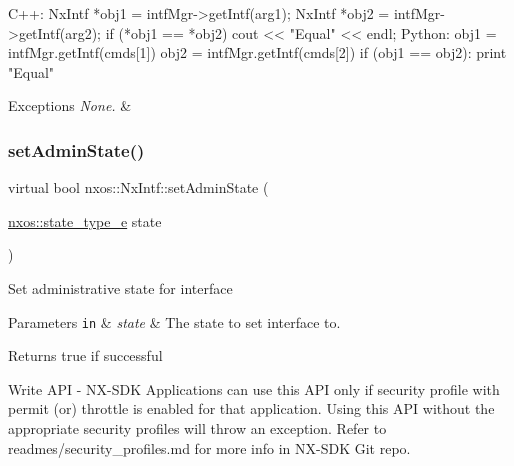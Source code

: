 \begin{DoxyCode}
C++:
     NxIntf *obj1 = intfMgr->getIntf(arg1);
     NxIntf *obj2 = intfMgr->getIntf(arg2);
     \textcolor{keywordflow}{if} (*obj1 == *obj2)
         cout << \textcolor{stringliteral}{"Equal"} << endl;
Python:
     obj1 = intfMgr.getIntf(cmds[1])
     obj2 = intfMgr.getIntf(cmds[2])
     \textcolor{keywordflow}{if} (obj1 == obj2):
         print \textcolor{stringliteral}{"Equal"}
\end{DoxyCode}



\begin{DoxyExceptions}{Exceptions}
{\em None.} & \\
\hline
\end{DoxyExceptions}
\mbox{\label{classnxos_1_1_nx_intf_a2244d9def0a3538d1f66f8816ad8b545}} 
\subsubsection{\texorpdfstring{set\+Admin\+State()}{setAdminState()}}
{\footnotesize\ttfamily virtual bool nxos\+::\+Nx\+Intf\+::set\+Admin\+State (\begin{DoxyParamCaption}\item[{\mbox{\hyperlink{nx__common_8h_a7c257059d03188765435b36e95dbb764}{nxos\+::state\+\_\+type\+\_\+e}}}]{state }\end{DoxyParamCaption})\hspace{0.3cm}{\ttfamily [pure virtual]}}

Set administrative state for interface 
\begin{DoxyParams}[1]{Parameters}
\mbox{\tt in}  & {\em state} & The state to set interface to. \\
\hline
\end{DoxyParams}
\begin{DoxyReturn}{Returns}
true if successful
\end{DoxyReturn}
\begin{DoxyVerb}Write API - NX-SDK Applications can use this API only if security profile with permit (or) throttle is 
            enabled for that application. Using this API without the appropriate security profiles will
            throw an exception. Refer to readmes/security_profiles.md for more info in NX-SDK Git repo.
\end{DoxyVerb}



